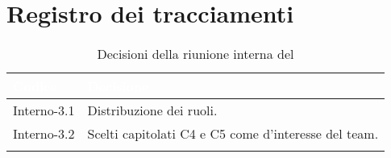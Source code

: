 \section{Registro dei tracciamenti}
{
\renewcommand{\arraystretch}{1.5}
\centering
\begin{longtable}{C{3cm} C{9cm}}
\textcolor{white}{\textbf{Codice}}&
\textcolor{white}{\textbf{Decisione}}\\	
\endhead
		
Interno-3.1 & Distribuzione dei ruoli.\\

Interno-3.2 & Scelti capitolati C4 e C5 come  d'interesse del team.\\
		
\caption{Decisioni della riunione interna del \Data{}}
\end{longtable}
}
